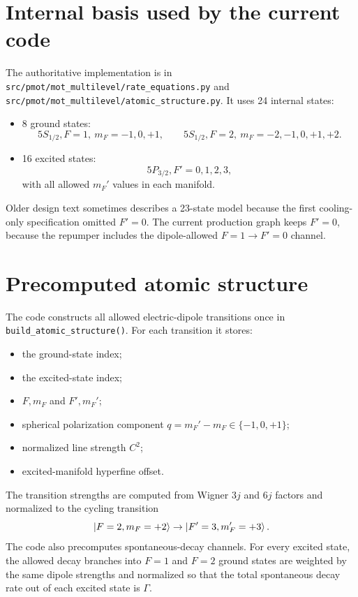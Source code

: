 \documentclass[11pt]{article}
\begin{document}
\section{Internal basis used by the current code}

The authoritative implementation is in
\texttt{src/pmot/mot\_multilevel/rate\_equations.py} and
\texttt{src/pmot/mot\_multilevel/atomic\_structure.py}.  It uses 24 internal
states:
\begin{itemize}[nosep]
    \item 8 ground states:
    \[
        5S_{1/2}, F=1,\ m_F=-1,0,+1,
        \qquad
        5S_{1/2}, F=2,\ m_F=-2,-1,0,+1,+2.
    \]
    \item 16 excited states:
    \[
        5P_{3/2}, F'=0,1,2,3,
    \]
    with all allowed \(m_F'\) values in each manifold.
\end{itemize}

Older design text sometimes describes a 23-state model because the first
cooling-only specification omitted \(F'=0\).  The current production graph keeps
\(F'=0\), because the repumper includes the dipole-allowed
\(F=1\rightarrow F'=0\) channel.

\section{Precomputed atomic structure}

The code constructs all allowed electric-dipole transitions once in
\texttt{build\_atomic\_structure()}.  For each transition it stores:
\begin{itemize}[nosep]
    \item the ground-state index;
    \item the excited-state index;
    \item \(F,m_F\) and \(F',m_F'\);
    \item spherical polarization component \(q=m_F'-m_F\in\{-1,0,+1\}\);
    \item normalized line strength \(C^2\);
    \item excited-manifold hyperfine offset.
\end{itemize}

The transition strengths are computed from Wigner \(3j\) and \(6j\) factors and
normalized to the cycling transition
\[
    \ket{F=2,m_F=+2}
    \rightarrow
    \ket{F'=3,m_F'=+3}.
\]
The code also precomputes spontaneous-decay channels.  For every excited state,
the allowed decay branches into \(F=1\) and \(F=2\) ground states are weighted by
the same dipole strengths and normalized so that the total spontaneous decay
rate out of each excited state is \(\Gamma\).
\end{document}
